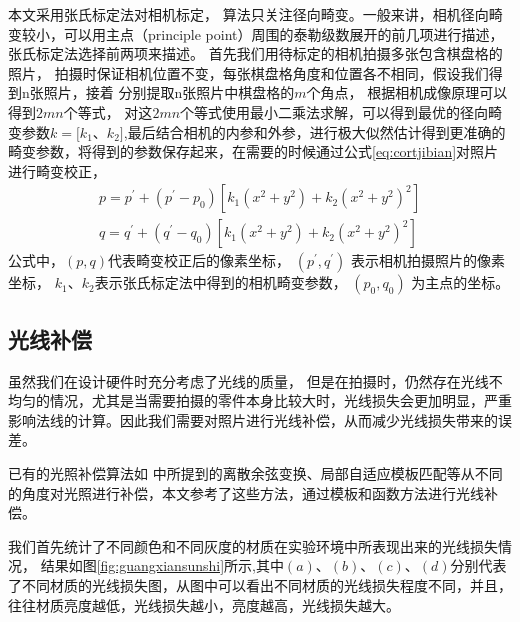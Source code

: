本文采用张氏标定法对相机标定，
算法只关注径向畸变。一般来讲，相机径向畸变较小，可以用主点（principle point）周围的泰勒级数展开的前几项进行描述，张氏标定法选择前两项来描述。
首先我们用待标定的相机拍摄多张包含棋盘格的照片，
拍摄时保证相机位置不变，每张棋盘格角度和位置各不相同，假设我们得到n张照片，接着
分别提取n张照片中棋盘格的$m$个角点，
根据相机成像原理可以得到$2mn$个等式，
对这$2mn$个等式使用最小二乘法求解，可以得到最优的径向畸变参数$k=[k_{1}$、$k_{2}]$,最后结合相机的内参和外参，进行极大似然估计得到更准确的畸变参数，将得到的参数保存起来，在需要的时候通过公式\eqref{eq:cortjibian}对照片进行畸变校正，
\begin{equation}\label{eq:cortjibian}
\begin{split}
p=p^{'}+(p^{'}-p_{0} )[k_{1} (x^{2}+y^{2} )+k_{2} (x^{2}+y^{2} )^{2} ]\\
q=q^{'}+(q^{'}-q_{0} )[k_{1} (x^{2}+y^{2} )+k_{2} (x^{2}+y^{2} )^{2} ]
\end{split}
\end{equation}
公式中，$(p,q)$代表畸变校正后的像素坐标，
$(p^{'}, q^{'})$
表示相机拍摄照片的像素坐标，
$k_{1}$、$k_{2}$表示张氏标定法中得到的相机畸变参数，
$(p_{0},q_{0})$
为主点的坐标。

\subsection{光线补偿}

虽然我们在设计硬件时充分考虑了光线的质量，
但是在拍摄时，仍然存在光线不均匀的情况，尤其是当需要拍摄的零件本身比较大时，光线损失会更加明显，严重影响法线的计算。因此我们需要对照片进行光线补偿，从而减少光线损失带来的误差。

已有的光照补偿算法如
\cite{贾灵芝2008基于自适应光线补偿的人脸检测算法,chen2006illumination,ruiz2008illumination,malassiotis2005robust,zheng2008intra,wiegand2003overview,tan2006intra,tan2007intra}中所提到的离散余弦变换、局部自适应模板匹配等从不同的角度对光照进行补偿，本文参考了这些方法，通过模板和函数方法进行光线补偿。

我们首先统计了不同颜色和不同灰度的材质在实验环境中所表现出来的光线损失情况，
结果如图\ref{fig:guangxiansunshi}所示,其中$(a)$、$(b)$、$(c)$、$(d)$分别代表了不同材质的光线损失图，从图中可以看出不同材质的光线损失程度不同，并且，往往材质亮度越低，光线损失越小，亮度越高，光线损失越大。

